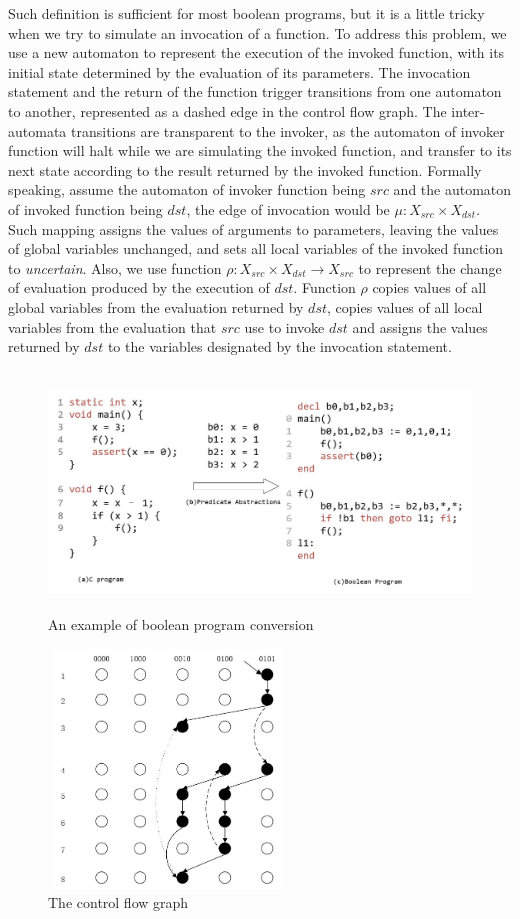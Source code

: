 Such definition is sufficient for most boolean programs, but it is a little tricky when we try to simulate an invocation of a function.
To address this problem, we use a new automaton to represent the execution of the invoked function, with its initial state determined by the evaluation of its parameters.
The invocation statement and the return of the function trigger transitions from one automaton to another, represented as a dashed edge in the control flow graph.
The inter-automata transitions are transparent to the invoker, as the automaton of invoker function will halt while we are simulating the invoked function, and transfer to its next state according to the result returned by the invoked function.
Formally speaking, assume the automaton of invoker function being $src$ and the automaton of invoked function being $dst$, the edge of invocation would be $\mu:X_{src}\times X_{dst}$. Such mapping assigns the values of arguments to parameters, leaving the values of global variables unchanged, and sets all local variables of the invoked function to {\it uncertain}. Also, we use function $\rho:X_{src}\times X_{dst} \to X_{src}$ to represent the change of evaluation produced by the execution of $dst$. Function $\rho$ copies values of all global variables from the evaluation returned by $dst$, copies values of all local variables from the evaluation that $src$ use to invoke $dst$ and assigns the values returned by $dst$ to the variables designated by the invocation statement.

\begin{figure}
\centering
\includegraphics[width=5in,height=2.5in]{img/Fig2-1.jpg}
\caption{An example of boolean program conversion}
\label{fig:BPC}
\end{figure}

\begin{figure}
\centering
\includegraphics[width=2.5in,height=2.5in]{img/Fig2-2.jpg}
\caption{The control flow graph}
\label{fig:CFG}
\end{figure}

